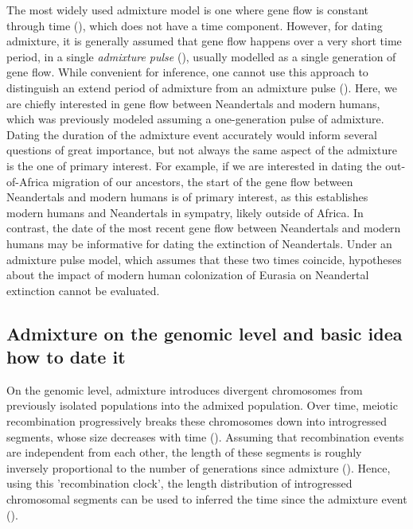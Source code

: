 \documentclass[]{article}
\begin{document}
The most widely used admixture model is one where gene flow is constant through time (\cite{nielsen_distinguishing_2001,hey_multilocus_2004}), which does not have a time component. However, for dating admixture, it is generally assumed that gene flow
happens over a very short time period, in a single \textit{admixture pulse} (\cite{moorjani_history_2011}), usually modelled as a single generation
of gene flow. While convenient for inference, one cannot use this approach to distinguish an extend period of admixture from an admixture pulse (\cite{pickrell_toward_2014}). 
Here, we are chiefly interested in gene flow between Neandertals and modern humans, which was previously modeled assuming a one-generation pulse of admixture. Dating the duration of the admixture event accurately would inform several questions of  great importance, but not always the same aspect of the admixture is the one of primary interest. For example, if we are interested in dating the out-of-Africa migration of our ancestors, the start of the gene flow between Neandertals and modern humans is of primary interest, as this establishes modern humans and Neandertals in sympatry, likely outside of Africa.
In contrast, the date of the most recent gene flow between Neandertals and modern humans may be informative for dating the extinction of Neandertals. Under an admixture pulse model, which assumes that these two times coincide, hypotheses about the impact of modern human colonization of Eurasia on Neandertal extinction cannot be evaluated.

\subsection{Admixture on the genomic level and basic idea how to date
it}\label{admixture-on-the-genomic-level-and-basic-idea-how-to-date-it}

On the genomic level, admixture introduces  divergent chromosomes from previously isolated populations 
into the admixed population. Over time, meiotic recombination
progressively breaks these chromosomes down into introgressed segments, whose size decreases with time (\cite{falush_inference_2003}). 
Assuming that recombination events are
independent from each other, the length of these segments  is roughly inversely proportional to  the number of
generations since admixture
(\cite{moorjani_history_2011,pool_inference_2009,gravel_population_2012,liang_lengths_2014}).
Hence, using this 'recombination clock', the length distribution of introgressed chromosomal segments
 can be used to inferred the time since the
admixture event 
(\cite{moorjani_history_2011,pugach_dating_2011,sankararaman_date_2012,loh_inferring_2013,sankararaman_combined_2016,pugach_gateway_2018,jacobs_multiple_2019,hellenthal_genetic_2014}).
\end{document}
